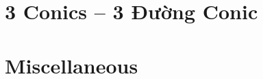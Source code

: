 \documentclass{article}
\begin{document}

\section{3 Conics -- 3 Đường Conic}


\section{Miscellaneous}


\printbibliography[heading=bibintoc]
	
\end{document}
